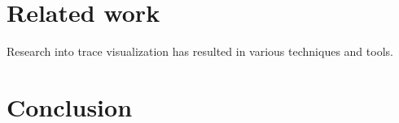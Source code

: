 \documentclass{sig-alternate}
\newcommand{\seclabel}[1]{\label{sec:#1}}
\begin{document}
\section{Related work}\seclabel{relatedwork}

Research into trace visualization has resulted in various techniques and tools.



\section{Conclusion}\seclabel{conclusion}




\end{document}
